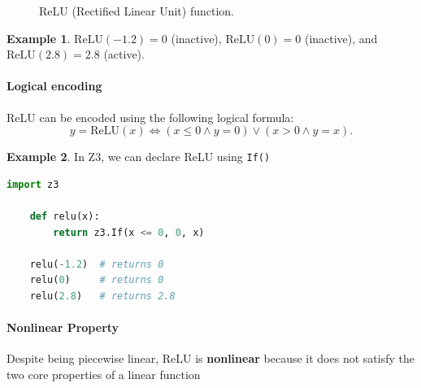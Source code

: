 \documentclass[oneside,11pt,dvipsnames]{book}
\numberwithin{equation}{section}
\theoremstyle{definition}
\newtheorem{example}{Example}[section]
\theoremstyle{remark}
\newcommand{\relu}[1]{\mathrm{ReLU}\left(#1\right)}
\begin{document}
\begin{figure}[h]
    \centering
    \caption{ReLU (Rectified Linear Unit) function.}\label{fig:relu}
\end{figure}

\begin{example}
$\relu{-1.2} = 0$ (inactive), $\relu{0} = 0$ (inactive), and $\relu{2.8} = 2.8$ (active).
\end{example}


\paragraph{Logical encoding} ReLU can be encoded using the following logical formula:
\[y = \relu{x} \iff (x \leq 0 \land y = 0) \lor (x > 0 \land y = x).\] 


\begin{example}
In Z3, we can declare ReLU using \texttt{If()}
\begin{lstlisting}[language=python]
    import z3

    def relu(x):
        return z3.If(x <= 0, 0, x)

    relu(-1.2)  # returns 0
    relu(0)     # returns 0
    relu(2.8)   # returns 2.8
\end{lstlisting}
\end{example}
\paragraph{Nonlinear Property} Despite being piecewise linear, ReLU is \textbf{nonlinear} because it does not satisfy the two core properties of a linear function
\end{document}
